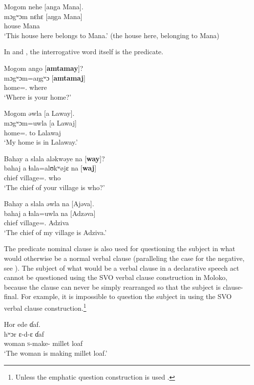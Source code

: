 \ea \label{ex:10:67}
Mogom  nehe  [anga  Mana].\\
\gll  mɔgʷɔm  nɛhɛ  [aŋga  Mana]\\
      house  {\DEM}  {\POSS}  Mana\\
\glt  ‘This house here belongs to Mana.’ (the house here, belonging to Mana)
\z

In  and , the interrogative word itself is the predicate. 

\ea \label{ex:10:68}
Mogom  ango  [\textbf{amtamay}]?\\
\gll  mɔgʷɔm=aŋgʷɔ     [\textbf{amtamaj}]\\
      home={\twoS}.{\POSS}  where\\
\glt  ‘Where is your home?’
\z

\clearpage
\ea \label{ex:10:69}
Mogom  əwla  [a Laway].\\
\gll  mɔgʷɔm=uwla     [a Lawaj]\\
      home={\oneS}.{\POSS}  to  Lalawaj\\
\glt  ‘My home is in Lalaway.’
\z

\ea \label{ex:10:70}
 Bahay  a  slala  aləkwəye na  [\textbf{way}]?\\
\gll  bahaj  a  ɬala=alʊkʷøjɛ  na  [\textbf{waj}]\\
      chief  {\GEN}  village={\twoP}.{\POSS}  {\PSP}  who\\
\glt  ‘The chief of your village is who?’
\z

\ea \label{ex:10:71}
Bahay  a  slala  əwla  na  [Ajəva].\\
\gll  bahaj  a  ɬala=uwla    na  [Adzəva]\\
      chief  {\GEN}  village={\oneS}.{\POSS}  {\PSP}  Adziva\\
\glt  ‘The chief of my village is Adziva.’
\z

The predicate nominal clause is also used for questioning the subject in what would otherwise be a normal verbal clause (paralleling the case for the negative, see ). The subject of what would be a verbal clause in a declarative speech act cannot be questioned using the SVO verbal clause construction in Moloko, because the clause can never be simply rearranged so that the subject is clause-final. For example, it is impossible to question the subject in  using the SVO verbal clause construction.\footnote{Unless the emphatic question construction is used .} 

\ea \label{ex:10:72}
Hor  ede  ɗaf.\\
\gll  hʷɔr  ɛ-d-ɛ    ɗaf\\
      woman  \textsc{s}-make-{\CL}  {millet loaf}\\
\glt  ‘The woman is making millet loaf.’
\z

